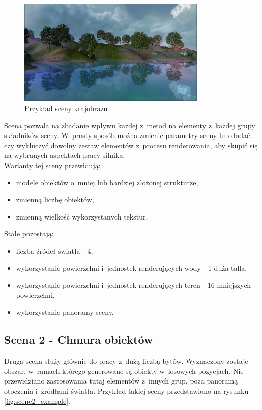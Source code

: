 \documentclass[a4paper,twoside,12pt]{book}
\begin{document}
\begin{figure}[H]
    \centering
    \includegraphics[width=0.8\textwidth]{res/scene1_example.png}
    \caption{Przykład sceny krajobrazu}
    \label{fig:scene1_example}
\end{figure}

Scena pozwala na zbadanie wpływu każdej z~metod na elementy z~każdej grupy składników sceny. W~prosty sposób można zmienić parametry sceny lub dodać czy wykluczyć dowolny zestaw elementów z~procesu renderowania, aby skupić się na wybranych aspektach pracy silnika. \\
Warianty tej sceny przewidują:
\begin{itemize}
    \item modele obiektów o~mniej lub bardziej złożonej strukturze,
    \item zmienną liczbę obiektów,
    \item zmienną wielkość wykorzystanych tekstur.
\end{itemize}

\vbox{}

Stałe pozostają:
\begin{itemize}
    \item liczba źródeł światła - 4,
    \item wykorzystanie powierzchni i~jednostek renderujących wody - 1 duża tafla,
    \item wykorzystanie powierzchni i~jednostek renderujących teren - 16 mniejszych powierzchni,
    \item wykorzystanie panoramy sceny.
\end{itemize}

\subsection{Scena 2 - Chmura obiektów}
Druga scena służy głównie do pracy z~dużą liczbą bytów. Wyznaczony zostaje obszar, w~ramach którego generowane są obiekty w~losowych pozycjach. Nie przewidziano zastosowania tutaj elementów z~innych grup, poza panoramą otoczenia i~źródłami światła. Przykład takiej sceny przedstawiono na rysunku \ref{fig:scene2_example}.
\end{document}
